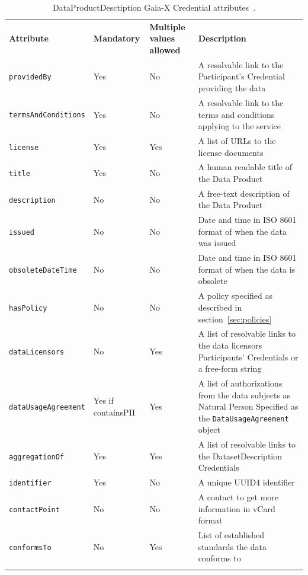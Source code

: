 \begin{longtable}{ |p{4cm}|p{2cm}|p{2cm}|p{7cm}| }
    \hhline{----}
    \textbf{Attribute} & \textbf{Mandatory} & \textbf{Multiple values allowed} & \textbf{Description}\\
    \hhline{----}
    \texttt{providedBy} & Yes & No & A resolvable link to the Participant's Credential providing the data\\
    \hhline{----}
    \texttt{termsAndConditions} & Yes & No & A resolvable link to the terms and conditions applying to the service\\
    \hhline{----}
    \texttt{license} & Yes & Yes & A list of URLs to the license documents\\
    \hhline{----}
    \texttt{title} & Yes & No & A human readable title of the Data Product\\
    \hhline{----}
    \texttt{description} & No & No & A free-text description of the Data Product\\
    \hhline{----}
    \texttt{issued} & No & No & Date and time in ISO 8601 format of when the data was issued\\
    \hhline{----}
    \texttt{obsoleteDateTime} & No & No & Date and time in ISO 8601 format of when the data is obsolete\\
    \hhline{----}
    \texttt{hasPolicy} & No & No & A policy specified as described in section~\ref{sec:policies}\\
    \hhline{----}
    \texttt{dataLicensors} & No & Yes & A list of resolvable links to the data licensors Participants' Credentials or a free-form string\\
    \hhline{----}
    \texttt{dataUsageAgreement} & Yes if containsPII & Yes & A list of authorizations from the data subjects as Natural Person
    Specified as the \texttt{DataUsageAgreement} object\\
    \hhline{----}
    \texttt{aggregationOf} & Yes & Yes & A list of resolvable links to the DatasetDescription Credentials\\
    \hhline{----}
    \texttt{identifier} & Yes & No & A unique UUID4 identifier\\
    \hhline{----}
    \texttt{contactPoint} & No & No & A contact to get more information in vCard format\\
    \hhline{----}
    \texttt{conformsTo} & No & Yes & List of established standards the data conforms to\\
    \hhline{----}
    \caption{DataProductDesctiption Gaia-X Credential attributes~\cite{gaiax_data_exchange_document}.}
    \label{tab:data_product_description}
\end{longtable}


